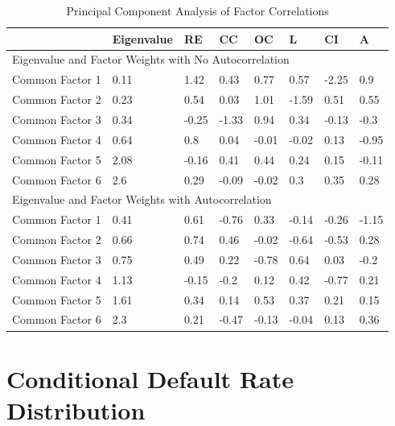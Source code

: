 \documentclass[a4j,12pt]{jarticle}
\begin{document}
\begin{table}[H]
\centering
\caption{Principal Component Analysis of Factor Correlations}
\begin{tabular}{|l|l|l|l|l|l|l|l|}
\hline
                & Eigenvalue & RE    & CC    & OC    & L     & CI    & A     \\ \hline
\multicolumn{8}{|l|}{Eigenvalue and Factor Weights with No Autocorrelation}  \\ \hline
Common Factor 1 & 0.11       & 1.42  & 0.43  & 0.77  & 0.57  & -2.25 & 0.9   \\ \hline
Common Factor 2 & 0.23       & 0.54  & 0.03  & 1.01  & -1.59 & 0.51  & 0.55  \\ \hline
Common Factor 3 & 0.34       & -0.25 & -1.33 & 0.94  & 0.34  & -0.13 & -0.3  \\ \hline
Common Factor 4 & 0.64       & 0.8   & 0.04  & -0.01 & -0.02 & 0.13  & -0.95 \\ \hline
Common Factor 5 & 2.08       & -0.16 & 0.41  & 0.44  & 0.24  & 0.15  & -0.11 \\ \hline
Common Factor 6 & 2.6        & 0.29  & -0.09 & -0.02 & 0.3   & 0.35  & 0.28  \\ \hline
\multicolumn{8}{|l|}{Eigenvalue and Factor Weights with Autocorrelation}     \\ \hline
Common Factor 1 & 0.41       & 0.61  & -0.76 & 0.33  & -0.14 & -0.26 & -1.15 \\ \hline
Common Factor 2 & 0.66       & 0.74  & 0.46  & -0.02 & -0.64 & -0.53 & 0.28  \\ \hline
Common Factor 3 & 0.75       & 0.49  & 0.22  & -0.78 & 0.64  & 0.03  & -0.2  \\ \hline
Common Factor 4 & 1.13       & -0.15 & -0.2  & 0.12  & 0.42  & -0.77 & 0.21  \\ \hline
Common Factor 5 & 1.61       & 0.34  & 0.14  & 0.53  & 0.37  & 0.21  & 0.15  \\ \hline
Common Factor 6 & 2.3        & 0.21  & -0.47 & -0.13 & -0.04 & 0.13  & 0.36  \\ \hline
\end{tabular}
\end{table}
\section{Conditional Default Rate Distribution}
\end{document}
